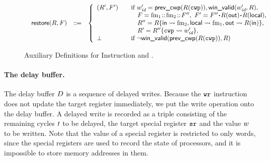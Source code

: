 \begin{figure}[!t]
\[\begin{array}{l}
\begin{array}{lcl}
            \incwin(\RFile, \Wstack) & \define &
            \left\{
            \begin{array}{ll}
                (\RFile', \Wstack')
                & \quad \text{if }
                             \cwp' = \postcwp(\RFile(\regcwp)),
                             \winvalid(\cwp', \RFile), \\
                & \quad \ \ \
                             \Wstack = \fm_1 \stCons \fm_2 \stCons \Wstack''  , \
                              \Wstack' = \Wstack''\lstApp \RFile(\outRN)
                                                  \lstApp \RFile(\localRN), \\
                & \quad \ \ \ \RFile'' =
                \RFile\{\inRN\rightsquigarrow \fm_2,
                        \localRN\rightsquigarrow \fm_1,
                        \outRN \rightsquigarrow \RFile(\inRN)\},
                \\
                 & \quad \ \ \
                            \RFile' = \fsubst{\RFile''}\regcwp{\cwp'},
                 \\
                \perp &\quad \text{if }
                                  \lnot\winvalid(\postcwp(R(\regcwp)), \RFile)
            \end{array}
            \right.
        \end{array}
    \end{array}
    \]
    \caption{Auxiliary Definitions for Instruction \csave{} and \crestore{}.}
    \label{fig:save and restore}
\end{figure}

\paragraph{\textbf{The delay buffer.}}
The delay buffer $D$ is a sequence of delayed writes.
Because the  $\texttt{wr}$ instruction
does not update the target register immediately,
we put the write operation onto the delay buffer.
A delayed write is recorded as a triple consisting of
the remaining cycles $t$ to be delayed,
the target special register $\texttt{sr}$ and the value
$w$ to be written. 
Note that the value of a special register is restricted to 
only words, since the special registers are used to record the
state of processors, and it is impossible to
store memory addresses in them.

